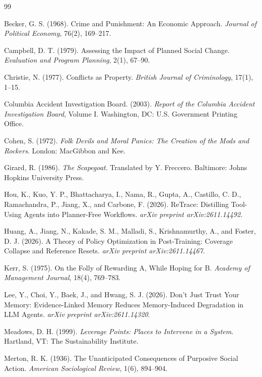 \documentclass[11pt]{article}
\theoremstyle{definition}
\begin{document}
\begin{thebibliography}{99}

Becker, G. S. (1968). Crime and Punishment: An Economic Approach. \emph{Journal of Political Economy}, 76(2), 169--217.

Campbell, D. T. (1979). Assessing the Impact of Planned Social Change. \emph{Evaluation and Program Planning}, 2(1), 67--90.

Christie, N. (1977). Conflicts as Property. \emph{British Journal of Criminology}, 17(1), 1--15.

Columbia Accident Investigation Board. (2003). \emph{Report of the Columbia Accident Investigation Board}, Volume I. Washington, DC: U.S. Government Printing Office.

Cohen, S. (1972). \emph{Folk Devils and Moral Panics: The Creation of the Mods and Rockers}. London: MacGibbon and Kee.

Girard, R. (1986). \emph{The Scapegoat}. Translated by Y. Freccero. Baltimore: Johns Hopkins University Press.

Hou, K., Kuo, Y. P., Bhattacharya, I., Nama, R., Gupta, A., Castillo, C. D., Ramachandra, P., Jiang, X., and Carbone, F. (2026). ReTrace: Distilling Tool-Using Agents into Planner-Free Workflows. \emph{arXiv preprint arXiv:2611.14492}.

Huang, A., Jiang, N., Kakade, S. M., Malladi, S., Krishnamurthy, A., and Foster, D. J. (2026). A Theory of Policy Optimization in Post-Training: Coverage Collapse and Reference Resets. \emph{arXiv preprint arXiv:2611.14467}.

Kerr, S. (1975). On the Folly of Rewarding A, While Hoping for B. \emph{Academy of Management Journal}, 18(4), 769--783.

Lee, Y., Choi, Y., Baek, J., and Hwang, S. J. (2026). Don't Just Trust Your Memory: Evidence-Linked Memory Reduces Memory-Induced Degradation in LLM Agents. \emph{arXiv preprint arXiv:2611.14320}.

Meadows, D. H. (1999). \emph{Leverage Points: Places to Intervene in a System}. Hartland, VT: The Sustainability Institute.

Merton, R. K. (1936). The Unanticipated Consequences of Purposive Social Action. \emph{American Sociological Review}, 1(6), 894--904.


\end{thebibliography}
\end{document}
